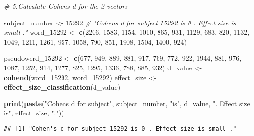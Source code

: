 \documentclass[
]{article}
\newenvironment{Shaded}{\begin{snugshade}}{\end{snugshade}}
\newcommand{\CommentTok}[1]{\textcolor[rgb]{0.56,0.35,0.01}{\textit{#1}}}
\newcommand{\DecValTok}[1]{\textcolor[rgb]{0.00,0.00,0.81}{#1}}
\newcommand{\FunctionTok}[1]{\textcolor[rgb]{0.13,0.29,0.53}{\textbf{#1}}}
\newcommand{\NormalTok}[1]{#1}
\newcommand{\OtherTok}[1]{\textcolor[rgb]{0.56,0.35,0.01}{#1}}
\newcommand{\StringTok}[1]{\textcolor[rgb]{0.31,0.60,0.02}{#1}}
\begin{document}
\begin{Shaded}
\begin{Highlighting}[]
\CommentTok{\# 5.Calculate Cohen\textquotesingle{}s d for the 2 vectors}

\NormalTok{subject\_number }\OtherTok{\textless{}{-}} \DecValTok{15292}
\CommentTok{\#  "Cohen\textquotesingle{}s d for subject 15292 is 0 . Effect size is small ."}
\NormalTok{word\_15292 }\OtherTok{\textless{}{-}} \FunctionTok{c}\NormalTok{(}\DecValTok{2206}\NormalTok{, }\DecValTok{1583}\NormalTok{, }\DecValTok{1154}\NormalTok{, }\DecValTok{1010}\NormalTok{,  }\DecValTok{865}\NormalTok{,  }\DecValTok{931}\NormalTok{, }\DecValTok{1129}\NormalTok{,  }\DecValTok{683}\NormalTok{,  }\DecValTok{820}\NormalTok{, }\DecValTok{1132}\NormalTok{, }\DecValTok{1049}\NormalTok{, }\DecValTok{1211}\NormalTok{, }\DecValTok{1261}\NormalTok{, }\DecValTok{957}\NormalTok{, }\DecValTok{1058}\NormalTok{,  }\DecValTok{790}\NormalTok{,  }\DecValTok{851}\NormalTok{, }\DecValTok{1908}\NormalTok{, }\DecValTok{1504}\NormalTok{, }\DecValTok{1400}\NormalTok{,  }\DecValTok{924}\NormalTok{)}

\NormalTok{pseudoword\_15292 }\OtherTok{\textless{}{-}} \FunctionTok{c}\NormalTok{(}\DecValTok{677}\NormalTok{,  }\DecValTok{949}\NormalTok{,  }\DecValTok{889}\NormalTok{,  }\DecValTok{881}\NormalTok{,  }\DecValTok{917}\NormalTok{,  }\DecValTok{769}\NormalTok{,  }\DecValTok{772}\NormalTok{,  }\DecValTok{922}\NormalTok{, }\DecValTok{1944}\NormalTok{,  }\DecValTok{881}\NormalTok{,  }\DecValTok{976}\NormalTok{, }\DecValTok{1087}\NormalTok{, }\DecValTok{1252}\NormalTok{,  }\DecValTok{914}\NormalTok{, }\DecValTok{1277}\NormalTok{,  }\DecValTok{825}\NormalTok{, }\DecValTok{1295}\NormalTok{, }\DecValTok{1336}\NormalTok{,  }\DecValTok{788}\NormalTok{,  }\DecValTok{885}\NormalTok{,  }\DecValTok{932}\NormalTok{)}
\NormalTok{d\_value }\OtherTok{\textless{}{-}} \FunctionTok{cohend}\NormalTok{(word\_15292, word\_15292)}
\NormalTok{effect\_size }\OtherTok{\textless{}{-}} \FunctionTok{effect\_size\_classification}\NormalTok{(d\_value)}

\FunctionTok{print}\NormalTok{(}\FunctionTok{paste}\NormalTok{(}\StringTok{"Cohen\textquotesingle{}s d for subject"}\NormalTok{, subject\_number, }\StringTok{"is"}\NormalTok{, d\_value, }\StringTok{". Effect size is"}\NormalTok{, effect\_size, }\StringTok{"."}\NormalTok{))}
\end{Highlighting}
\end{Shaded}

\begin{verbatim}
## [1] "Cohen's d for subject 15292 is 0 . Effect size is small ."
\end{verbatim}
\end{document}
